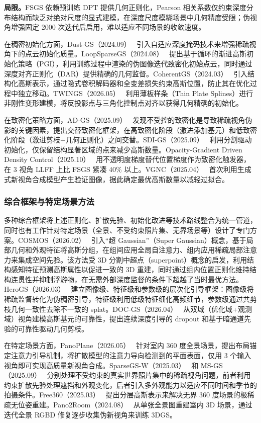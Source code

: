 \textbf{局限。}FSGS 依赖预训练 DPT 提供几何正则化，Pearson 相关系数仅约束深度分布结构而缺乏对绝对尺度的显式建模，在深度尺度模糊场景中几何精度受限；伪视角增强固定 2000 次迭代后启用，难以适应不同场景的收敛速度。

在稠密初始化方面，Dust-GS（2024.09）~\cite{2409_08613} 引入自适应深度掩码技术来增强稀疏视角下的点云初始化质量。LoopSparseGS（2024.08）~\cite{2408_00254} 提出基于循环的渐进高斯初始化策略（PGI），利用训练过程中渲染的伪图像迭代致密化初始点云，同时通过深度对齐正则化（DAR）提供精确的几何监督。CoherentGS（2024.03）~\cite{2403_19495} 引入结构化高斯表示，通过隐式卷积解码器和全变差损失约束高斯位置，防止其在优化过程中独立移动。TWINGS（2026.05）~\cite{2605_22069} 利用薄板样条（Thin Plate Splines）进行非刚性变形建模，将反投影点与三角化控制点对齐以获得几何精确的初始化。

在致密化策略方面，AD-GS（2025.09）~\cite{2509_11003} 发现不受控的致密化是导致稀疏视角伪影的关键因素，提出交替致密化框架，在高致密化阶段（激进添加基元）和低致密化阶段（激进剪枝+几何正则化）之间交替。SDI-GS（2025.09）~\cite{2509_11853} 利用分割驱动初始化，仅保留结构显著区域的点来减少高斯数量。Opacity-Gradient Driven Density Control（2025.10）~\cite{2510_10257} 用不透明度梯度替代位置梯度作为致密化触发器，在 3 视角 LLFF 上比 FSGS 紧凑 40\% 以上。VGNC（2025.04）~\cite{2504_14548} 首次利用生成式新视角合成模型产生验证图像，据此确定最优高斯数量以减轻过拟合。

\subsubsection{综合框架与特定场景方法}

多种综合框架将上述正则化、扩散先验、初始化改进等技术路线整合为统一管道，同时也有工作针对特定场景（全景、不受约束照片集、无界场景等）设计了专门方案。COSMOS（2026.02）~\cite{2602_06044} 引入``超 Gaussian''（Super Gaussian）概念，基于局部几何和外观特征将高斯分组，在组间应用全局自注意力、组内应用稀疏局部注意力来集成空间先验。该方法受 3D 分割中超点（superpoint）概念的启发，利用结构感知特征预测高斯属性以促进一致的 3D 重建，同时通过组内位置正则化维持结构连贯性并抑制浮游物，在无需外部深度监督的条件下超越了当时最优方法。HeroGS（2026.03）~\cite{2603_01099} 建立图像级、特征级和参数级的层次化引导框架：图像级将稀疏监督转化为伪稠密引导，特征级利用低级特征细化高频细节，参数级通过共剪枝几何一致性去除不一致的 splat。DOC-GS（2026.04）~\cite{2604_06739} 从双域（优化域+观测域）视角建模高斯基元的可靠性，提出连续深度引导的 dropout 和基于暗通道先验的可靠性驱动几何剪枝。

在特定场景方面，PanoPlane（2026.05）~\cite{2605_14135} 针对室内 360 度全景场景，提出布局锚定注意力引导机制，将扩散模型的注意力导向检测到的平面表面，仅用 3 个输入视角即可实现高质量新视角合成。SparseGS-W（2025.03）~\cite{2503_19452} 和 MS-GS（2025.09）~\cite{2509_15548} 分别处理不受约束的真实世界照片集中的稀疏视角问题，前者利用约束扩散先验处理遮挡和外观变化，后者引入多外观能力以适应不同时间和季节的拍摄条件。Free360（2025.03）~\cite{2503_24382} 提出分层高斯表示来解决无界 360 度场景的极稀疏无位姿重建。Pano2Room（2024.08）~\cite{2408_11413} 从单张全景图重建室内 3D 场景，通过迭代全景 RGBD 修复逐步收集伪新视角来训练 3DGS。


